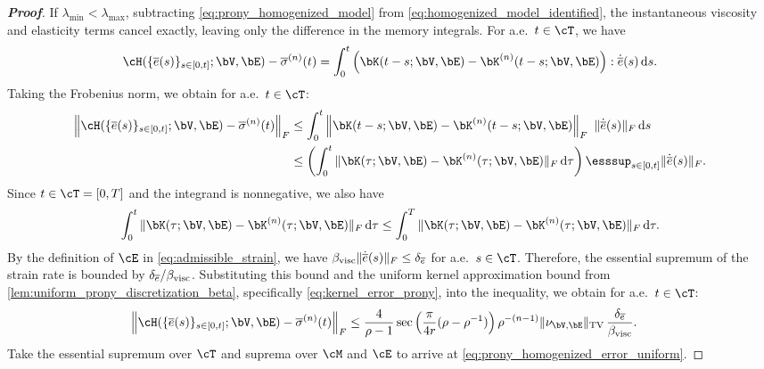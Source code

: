 \begin{proof}[\bf Proof]
If $\lambda_{\min}<\lambda_{\max}$, subtracting \cref{eq:prony_homogenized_model} from \cref{eq:homogenized_model_identified}, the instantaneous viscosity and elasticity terms cancel exactly, leaving only the difference in the memory integrals. For a.e.\ $t\in\cT$, we have
\begin{equation*}
\cH(\{\overline{e}(s)\}_{s\in[0,t]};\bV,\bE)-\overline{\sigma}^{(n)}(t)
=
\int_0^t\left(\bK(t-s;\bV,\bE)-\bK^{(n)}(t-s;\bV,\bE)\right):\dot{\overline{e}}(s)\,\mathrm{d}s.
\end{equation*}
Taking the Frobenius norm, we obtain for a.e.\ $t\in\cT$:
\begin{align*}
\left\|\cH(\{\overline{e}(s)\}_{s\in[0,t]};\bV,\bE)-\overline{\sigma}^{(n)}(t)\right\|_F
&\leq
\int_0^t \left\|\bK(t-s;\bV,\bE)-\bK^{(n)}(t-s;\bV,\bE)\right\|_F\ \|\dot{\overline{e}}(s)\|_F\,\mathrm{d}s\\
&\le
\left(\int_0^t \|\bK(\tau;\bV,\bE)-\bK^{(n)}(\tau;\bV,\bE)\|_F\,\mathrm{d}\tau\right)\esssup_{s\in[0,t]} \|\dot{\overline{e}}(s)\|_F.
\end{align*}
Since $t\in\cT=[0,T]$ and the integrand is nonnegative, we also have
\begin{equation*}
\int_0^t \|\bK(\tau;\bV,\bE)-\bK^{(n)}(\tau;\bV,\bE)\|_F\,\mathrm{d}\tau
\le
\int_0^T \|\bK(\tau;\bV,\bE)-\bK^{(n)}(\tau;\bV,\bE)\|_F\,\mathrm{d}\tau.
\end{equation*}
By the definition of $\cE$ in \cref{eq:admissible_strain}, we have $\beta_{\rm visc}\|\dot{\overline{e}}(s)\|_F \le \delta_{\overline{e}}$ for a.e.\ $s \in \cT$. Therefore, the essential supremum of the strain rate is bounded by $\delta_{\overline{e}}/\beta_{\rm visc}$.
Substituting this bound and the uniform kernel approximation bound from \cref{lem:uniform_prony_discretization_beta}, specifically \cref{eq:kernel_error_prony}, into the inequality, we obtain for a.e.\ $t\in\cT$:
\begin{align*}
\left\|\cH(\{\overline{e}(s)\}_{s\in[0,t]};\bV,\bE)-\overline{\sigma}^{(n)}(t)\right\|_F
&\leq
\frac{4}{\rho-1}
\sec\left(\frac{\pi}{4r}(\rho-\rho^{-1})
\right)
\rho^{-(n-1)}
\|\nu_{\bV,\bE}\|_{\mathrm{TV}}\,\frac{\delta_{\overline{e}}}{\beta_{\rm visc}}.
\end{align*}
Take the essential supremum over $\cT$ and suprema over $\cM$ and $\cE$ to arrive at \cref{eq:prony_homogenized_error_uniform}.
\end{proof}

